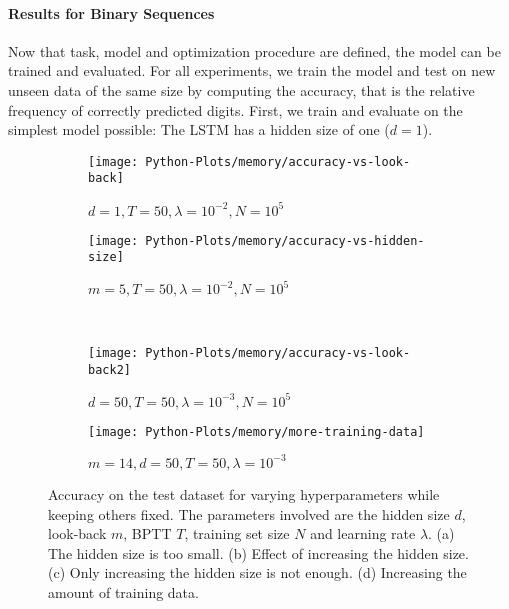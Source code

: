 		\paragraph{Results for Binary Sequences}
		Now that task, model and optimization procedure are defined, the model can be trained and evaluated.
		For all experiments, we train the model and test on new unseen data of the same size by computing the accuracy, that is the relative frequency of correctly predicted digits.
		First, we train and evaluate on the simplest model possible: The LSTM has a hidden size of one ($d = 1$).
		\begin{figure}[tb]
			\centering
			\begin{subfigure}[b]{0.5\linewidth}
				\centering
				\texttt{[image: Python-Plots/memory/accuracy-vs-look-back]}
				\caption{
					$d = 1, T = 50, \lambda = 10^{-2}, N = 10^5$
					\label{fig:accuracy-vs-look-back}
				}
			\end{subfigure}%
			\begin{subfigure}[b]{0.5\linewidth}
				\texttt{[image: Python-Plots/memory/accuracy-vs-hidden-size]}
				\caption{
					$m = 5, T = 50, \lambda = 10^{-2}, N = 10^5$
					\label{fig:accuracy-vs-hidden-size}
				}
			\end{subfigure}
			\\
			\begin{subfigure}[b]{0.5\linewidth}
				\texttt{[image: Python-Plots/memory/accuracy-vs-look-back2]}
				\caption{
					$d = 50, T = 50, \lambda = 10^{-3}, N = 10^5$
					\label{fig:accuracy-vs-look-back2}
				}
			\end{subfigure}%
			\begin{subfigure}[b]{0.5\linewidth}
				\texttt{[image: Python-Plots/memory/more-training-data]}
				\caption{
					$m = 14, d = 50, T = 50, \lambda = 10^{-3}$
					\label{fig:more-training-data}
				}
			\end{subfigure}
			\caption[Memorizing the past with the LSTM: Binary digits]
					{Accuracy on the test dataset for varying hyperparameters while keeping others fixed. 
					 The parameters involved are the hidden size $d$, look-back $m$, BPTT $T$, training set size $N$ and learning rate $\lambda$. 
					 (a) The hidden size is too small.
					 (b) Effect of increasing the hidden size.
					 (c) Only increasing the hidden size is not enough.
					 (d) Increasing the amount of training data.
					 \label{fig:ablation-study-binary-memory}}
			
		\end{figure}
